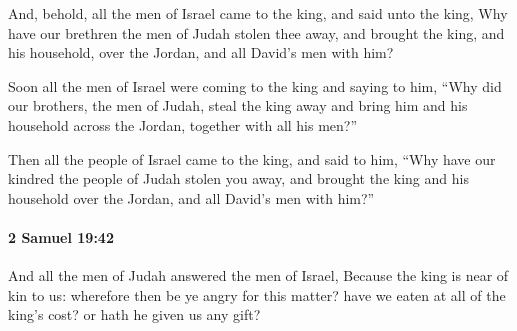 			\begin{versebox}
					\item[BHS] 
					\item[ASV] And, behold, all the men of Israel came to the king, and said unto the king, Why have our brethren the men of Judah stolen thee away, and brought the king, and his household, over the Jordan, and all David's men with him?
					\item[NIV] Soon all the men of Israel were coming to the king and saying to him, “Why did our brothers, the men of Judah, steal the king away and bring him and his household across the Jordan, together with all his men?”
					\item[NRSV] Then all the people of Israel came to the king, and said to him, “Why have our kindred the people of Judah stolen you away, and brought the king and his household over the Jordan, and all David’s men with him?”
			\end{versebox}

		\paragraph{2 Samuel 19:42} %
			\label{2SAMUEL-19-42}

			And all the men of Judah answered the men of Israel, Because the king is near of kin to us: wherefore then be ye angry for this matter? have we eaten at all of the king’s cost? or hath he given us any gift?

